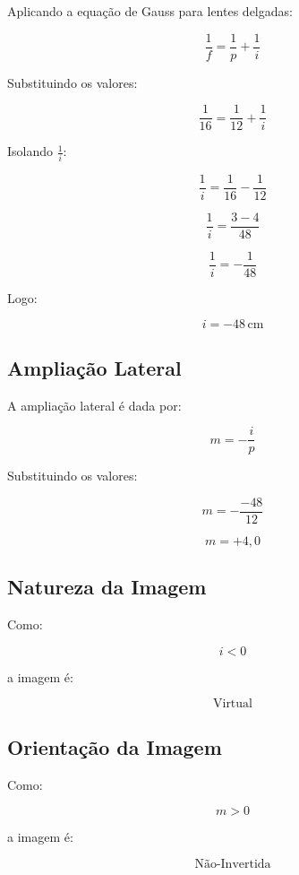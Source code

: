 \documentclass[12pt,a4paper]{article}
\begin{document}
Aplicando a equação de Gauss para lentes delgadas:

\[
\frac{1}{f}
=
\frac{1}{p}
+
\frac{1}{i}
\]

Substituindo os valores:

\[
\frac{1}{16}
=
\frac{1}{12}
+
\frac{1}{i}
\]

Isolando $\frac{1}{i}$:

\[
\frac{1}{i}
=
\frac{1}{16}
-
\frac{1}{12}
\]

\[
\frac{1}{i}
=
\frac{3 - 4}{48}
\]

\[
\frac{1}{i}
=
-\frac{1}{48}
\]

Logo:

\[
i = -48\,\text{cm}
\]


\subsection*{Ampliação Lateral}

A ampliação lateral é dada por:

\[
m = -\frac{i}{p}
\]

Substituindo os valores:

\[
m
=
-\frac{-48}{12}
\]

\[
m = +4,0
\]


\subsection*{Natureza da Imagem}

Como:

\[
i < 0
\]

a imagem é:

\[
\boxed{\text{Virtual}}
\]


\subsection*{Orientação da Imagem}

Como:

\[
m > 0
\]

a imagem é:

\[
\boxed{\text{Não-Invertida}}
\]

\end{document}
